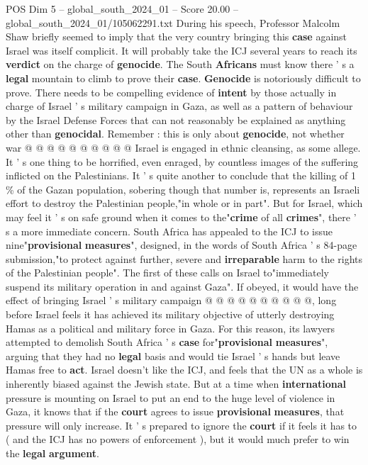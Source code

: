 \begin{textsample}{POS Dim 5 – global\_south\_2024\_01 – Score 20.00 – global\_south\_2024\_01/105062291.txt}
During his speech, Professor Malcolm Shaw briefly seemed to imply that the very country bringing this \textbf{case} against Israel was itself complicit.
It will probably take the ICJ several years to reach its \textbf{verdict} on the charge of \textbf{genocide}.
The South \textbf{Africans} must know there ' s a \textbf{legal} mountain to climb to prove their \textbf{case}. \textbf{Genocide} is notoriously difficult to prove.
There needs to be compelling evidence of \textbf{intent} by those actually in charge of Israel ' s military campaign in Gaza, as well as a pattern of behaviour by the Israel Defense Forces that can not reasonably be explained as anything other than \textbf{genocidal}.
Remember : this is only about \textbf{genocide}, not whether war @ @ @ @ @ @ @ @ @ @ Israel is engaged in ethnic cleansing, as some allege.
It ' s one thing to be horrified, even enraged, by countless images of the suffering inflicted on the Palestinians.
It ' s quite another to conclude that the killing of 1 \% of the Gazan population, sobering though that number is, represents an Israeli effort to destroy the Palestinian people,"in whole or in part".
But for Israel, which may feel it ' s on safe ground when it comes to the"\textbf{crime} of all \textbf{crimes}", there ' s a more immediate concern.
South Africa has appealed to the ICJ to issue nine"\textbf{provisional} \textbf{measures}", designed, in the words of South Africa ' s 84-page submission,"to protect against further, severe and \textbf{irreparable} harm to the rights of the Palestinian people".
The first of these calls on Israel to"immediately suspend its military operation in and against Gaza".
If obeyed, it would have the effect of bringing Israel ' s military campaign @ @ @ @ @ @ @ @ @ @, long before Israel feels it has achieved its military objective of utterly destroying Hamas as a political and military force in Gaza.
For this reason, its lawyers attempted to demolish South Africa ' s \textbf{case} for"\textbf{provisional} \textbf{measures}", arguing that they had no \textbf{legal} basis and would tie Israel ' s hands but leave Hamas free to \textbf{act}.
Israel doesn't like the ICJ, and feels that the UN as a whole is inherently biased against the Jewish state.
But at a time when \textbf{international} pressure is mounting on Israel to put an end to the huge level of violence in Gaza, it knows that if the \textbf{court} agrees to issue \textbf{provisional} \textbf{measures}, that pressure will only increase.
It ' s prepared to ignore the \textbf{court} if it feels it has to ( and the ICJ has no powers of enforcement ), but it would much prefer to win the \textbf{legal} \textbf{argument}.

\end{textsample}
